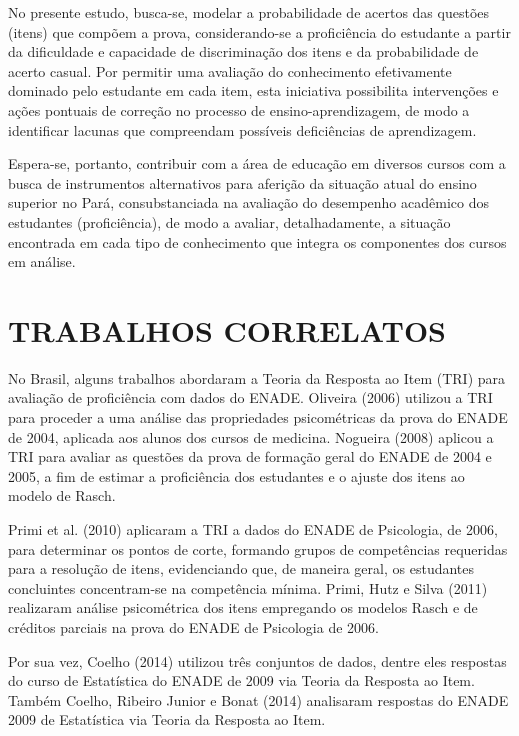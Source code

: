 \documentclass[12pt]{article}
\begin{document}
No presente estudo, busca-se, modelar a probabilidade de acertos das questões (itens) que compõem a prova, considerando-se a proficiência do estudante a partir da dificuldade e capacidade de discriminação dos itens e da probabilidade de acerto casual. Por permitir uma avaliação do conhecimento efetivamente dominado pelo estudante em cada item, esta iniciativa possibilita intervenções e ações pontuais de correção no processo de ensino-aprendizagem, de modo a identificar lacunas que compreendam possíveis deficiências de aprendizagem.

Espera-se, portanto, contribuir com a área de educação em diversos cursos com a busca de instrumentos alternativos para aferição da situação atual do ensino superior no Pará, consubstanciada na avaliação do desempenho acadêmico dos estudantes (proficiência), de modo a avaliar, detalhadamente, a situação encontrada em cada tipo de conhecimento que integra os componentes dos cursos em análise.  



\section{TRABALHOS CORRELATOS} \label{sec:firstpage}
No Brasil, alguns trabalhos abordaram a Teoria da Resposta ao Item (TRI) para avaliação de proficiência com dados do ENADE. Oliveira (2006) utilizou a TRI para proceder a uma análise das propriedades psicométricas da prova do ENADE de 2004, aplicada aos alunos dos cursos de medicina. Nogueira (2008) aplicou a TRI para avaliar as questões da prova de formação geral do ENADE de 2004 e 2005, a fim de estimar a proficiência dos estudantes e o ajuste dos itens ao modelo de Rasch.

Primi et al. (2010) aplicaram a TRI a dados do ENADE de Psicologia, de 2006, para determinar os pontos de corte, formando grupos de competências requeridas para a resolução de itens, evidenciando que, de maneira geral, os estudantes concluintes concentram-se na competência mínima. Primi, Hutz e Silva (2011) realizaram análise psicométrica dos itens empregando os modelos Rasch e de créditos parciais na prova do ENADE de Psicologia de 2006.

Por sua vez, Coelho (2014) utilizou três conjuntos de dados, dentre eles respostas do curso de Estatística do ENADE de 2009 via Teoria da Resposta ao Item. Também Coelho, Ribeiro Junior e Bonat (2014) analisaram respostas do ENADE 2009 de Estatística via Teoria da Resposta ao Item.
\end{document}
